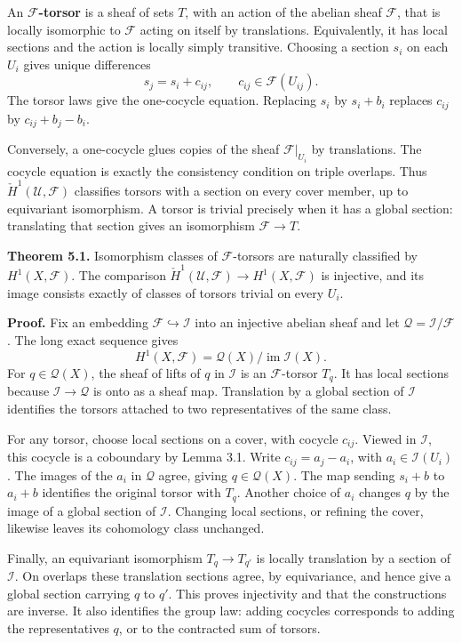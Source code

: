 \documentclass[11pt]{article}
\begin{document}
An \textbf{\(\mathcal F\)-torsor} is a sheaf of sets \(T\), with an
action of the abelian sheaf \(\mathcal F\), that is locally isomorphic
to \(\mathcal F\) acting on itself by translations. Equivalently, it has
local sections and the action is locally simply transitive. Choosing a
section \(s_i\) on each \(U_i\) gives unique differences \[
s_j=s_i+c_{ij},\qquad c_{ij}\in\mathcal F(U_{ij}).
\] The torsor laws give the one-cocycle equation. Replacing \(s_i\) by
\(s_i+b_i\) replaces \(c_{ij}\) by \(c_{ij}+b_j-b_i\).

Conversely, a one-cocycle glues copies of the sheaf
\(\mathcal F|_{U_i}\) by translations. The cocycle equation is exactly
the consistency condition on triple overlaps. Thus
\(\check H^1(\mathcal U,\mathcal F)\) classifies torsors with a section
on every cover member, up to equivariant isomorphism. A torsor is
trivial precisely when it has a global section: translating that section
gives an isomorphism \(\mathcal F\to T\).

\textbf{Theorem 5.1.} Isomorphism classes of \(\mathcal F\)-torsors are
naturally classified by \(H^1(X,\mathcal F)\). The comparison
\(\check H^1(\mathcal U,\mathcal F)\to H^1(X,\mathcal F)\) is injective,
and its image consists exactly of classes of torsors trivial on every
\(U_i\).

\textbf{Proof.} Fix an embedding \(\mathcal F\hookrightarrow\mathcal I\)
into an injective abelian sheaf and let
\(\mathcal Q=\mathcal I/\mathcal F\). The long exact sequence gives \[
H^1(X,\mathcal F)=\mathcal Q(X)/\operatorname{im}\mathcal I(X).
\] For \(q\in\mathcal Q(X)\), the sheaf of lifts of \(q\) in
\(\mathcal I\) is an \(\mathcal F\)-torsor \(T_q\). It has local
sections because \(\mathcal I\to\mathcal Q\) is onto as a sheaf map.
Translation by a global section of \(\mathcal I\) identifies the torsors
attached to two representatives of the same class.

For any torsor, choose local sections on a cover, with cocycle
\(c_{ij}\). Viewed in \(\mathcal I\), this cocycle is a coboundary by
Lemma 3.1. Write \(c_{ij}=a_j-a_i\), with \(a_i\in\mathcal I(U_i)\). The
images of the \(a_i\) in \(\mathcal Q\) agree, giving
\(q\in\mathcal Q(X)\). The map sending \(s_i+b\) to \(a_i+b\) identifies
the original torsor with \(T_q\). Another choice of \(a_i\) changes
\(q\) by the image of a global section of \(\mathcal I\). Changing local
sections, or refining the cover, likewise leaves its cohomology class
unchanged.

Finally, an equivariant isomorphism \(T_q\to T_{q'}\) is locally
translation by a section of \(\mathcal I\). On overlaps these
translation sections agree, by equivariance, and hence give a global
section carrying \(q\) to \(q'\). This proves injectivity and that the
constructions are inverse. It also identifies the group law: adding
cocycles corresponds to adding the representatives \(q\), or to the
contracted sum of torsors.
\end{document}
